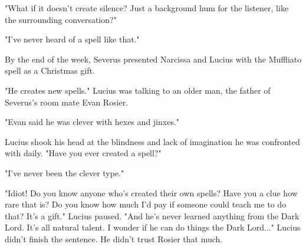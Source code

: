\documentclass[a4paper,11pt]{article}
\begin{document}
"What if it doesn't create silence? Just a background hum for the listener, like the surrounding conversation?"

"I've never heard of a spell like that."

By the end of the week, Severus presented Narcissa and Lucius with the Muffliato spell as a Christmas gift.

"He creates new spells." Lucius was talking to an older man, the father of Severus's room mate Evan Rosier.

"Evan said he was clever with hexes and jinxes."

Lucius shook his head at the blindness and lack of imagination he was confronted with daily. "Have you ever created a spell?"

"I've never been the clever type."

"Idiot! Do you know anyone who's created their own spells? Have you a clue how rare that is? Do you know how much I'd pay if someone could teach me to do that? It's a gift." Lucius paused. "And he's never learned anything from the Dark Lord. It's all natural talent. I wonder if he can do things the Dark Lord..." Lucius didn't finish the sentence. He didn't trust Rosier that much.
\end{document}
